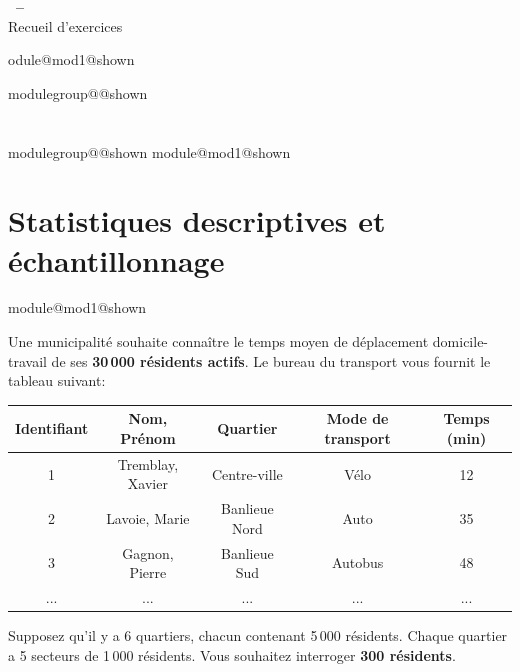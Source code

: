 \documentclass{Evaluation}
\makeatletter
\newcommand{\currentmodulekey}{}
\newcommand{\currentmoduletitle}{}
\newcommand{\currentgroupkey}{}
\newcommand{\currentgrouptitle}{}
\newcommand{\moduleheader}[2]{%
  \renewcommand{\currentmodulekey}{#1}%
  \renewcommand{\currentmoduletitle}{#2}%
  \expandafter\global\expandafter\let\csname module@#1@shown\endcsname\relax
}
\newcommand{\showmoduleifneeded}{%
  \ifx\currentgroupkey\empty\else
    \expandafter\ifx\csname modulegroup@\currentgroupkey @shown\endcsname\relax
      \section*{\currentgrouptitle}%
      \expandafter\gdef\csname modulegroup@\currentgroupkey @shown\endcsname{1}%
    \fi
  \fi
  \expandafter\ifx\csname module@\currentmodulekey @shown\endcsname\relax
    \section*{\currentmoduletitle}%
    \expandafter\gdef\csname module@\currentmodulekey @shown\endcsname{1}%
  \fi
}
\newenvironment{A25}{\showmoduleifneeded}{}
\makeatother
\begin{document}
\begin{center}
  {\Large\textbf{\SigleNumero\ -- \NomCours}}\\[0.3cm]
  {\large Recueil d'exercices}
\end{center}
\medskip

\begin{questions}

\moduleheader{mod1}{Statistiques descriptives et échantillonnage}

\begin{A25}
\question Une municipalité souhaite connaître le temps moyen de déplacement domicile-travail de ses \textbf{30\,000 résidents actifs}. Le bureau du transport vous fournit le tableau suivant:

\begin{table}[h]
    \centering
    \begin{tabular}{|c|c|c|c|c|}
    \hline
        Identifiant & Nom, Prénom & Quartier & Mode de transport & Temps (min) \\
        \hline
        1 & Tremblay, Xavier & Centre-ville & Vélo & 12 \\
        \hline
        2 & Lavoie, Marie & Banlieue Nord & Auto & 35 \\
        \hline
        3 & Gagnon, Pierre & Banlieue Sud & Autobus & 48 \\
        \hline
        ... & ... & ... & ... & ... \\
        \hline
    \end{tabular}
\end{table}

Supposez qu'il y a 6 quartiers, chacun contenant 5\,000 résidents. Chaque quartier a 5 secteurs de 1\,000 résidents. Vous souhaitez interroger \textbf{300 résidents}.

\end{A25}
\end{questions}
\end{document}
